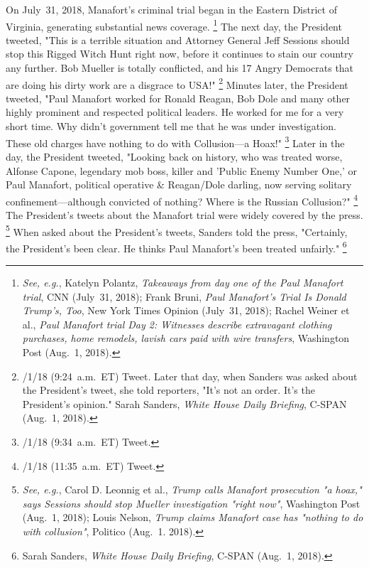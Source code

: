 On July~31, 2018, Manafort's criminal trial began in the Eastern District of Virginia, generating substantial news coverage.%
\footnote{\textit{See, e.g.}, Katelyn Polantz, \textit{Takeaways from day one of the Paul Manafort trial}, CNN (July~31, 2018);
Frank Bruni, \textit{Paul Manafort's Trial Is Donald Trump's, Too}, New York Times Opinion (July~31, 2018);
Rachel Weiner et al., \textit{Paul Manafort trial Day 2: Witnesses describe extravagant clothing purchases, home remodels, lavish cars paid with wire transfers}, Washington Post (Aug.~1, 2018).}
The next day, the President tweeted, "This is a terrible situation and Attorney General Jeff Sessions should stop this Rigged Witch Hunt right now, before it continues to stain our country any further.
Bob Mueller is totally conflicted, and his 17 Angry Democrats that are doing his dirty work are a disgrace to USA!"%
\footnote{/1/18 (9:24~a.m.~ET) Tweet.
Later that day, when Sanders was asked about the President's tweet, she told reporters, "It's not an order.
It's the President's opinion."
Sarah Sanders, \textit{White House Daily Briefing}, C-SPAN (Aug.~1, 2018).}
Minutes later, the President tweeted, "Paul Manafort worked for Ronald Reagan, Bob Dole and many other highly prominent and respected political leaders.
He worked for me for a very short time.
Why didn't government tell me that he was under investigation.
These old charges have nothing to do with Collusion---a Hoax!"%
\footnote{/1/18 (9:34~a.m.~ET) Tweet.}
Later in the day, the President tweeted, "Looking back on history, who was treated worse, Alfonse Capone, legendary mob boss, killer and 'Public Enemy Number One,' or Paul Manafort, political operative \& Reagan/Dole darling, now serving solitary confinement---although convicted of nothing?
Where is the Russian Collusion?"%
\footnote{/1/18 (11:35~a.m.~ET) Tweet.}
The President's tweets about the Manafort trial were widely covered by the press.%
\footnote{\textit{See, e.g.}, Carol D. Leonnig et al., \textit{Trump calls Manafort prosecution "a hoax," says Sessions should stop Mueller investigation "right now"}, Washington Post (Aug.~1, 2018);
Louis Nelson, \textit{Trump claims Manafort case has "nothing to do with collusion"}, Politico (Aug.~1. 2018).}
When asked about the President's tweets, Sanders told the press, "Certainly, the President's been clear.
He thinks Paul Manafort's been treated unfairly."%
\footnote{Sarah Sanders, \textit{White House Daily Briefing}, C-SPAN (Aug.~1, 2018).}

